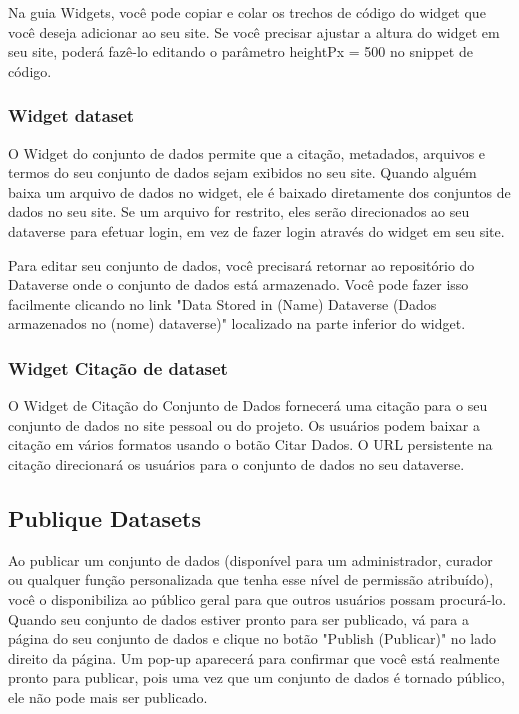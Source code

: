 \documentclass[12pt,hidelinks]{article}
\begin{document}
Na guia Widgets, você pode copiar e colar os trechos de código do widget que você deseja adicionar ao seu site. Se você precisar ajustar a altura do widget em seu site, poderá fazê-lo editando o parâmetro heightPx = 500 no snippet de código.

        \subsubsection{Widget dataset}
        
\qquad O Widget do conjunto de dados permite que a citação, metadados, arquivos e termos do seu conjunto de dados sejam exibidos no seu site. Quando alguém baixa um arquivo de dados no widget, ele é baixado diretamente dos conjuntos de dados no seu site. Se um arquivo for restrito, eles serão direcionados ao seu dataverse para efetuar login, em vez de fazer login através do widget em seu site.

Para editar seu conjunto de dados, você precisará retornar ao repositório do Dataverse onde o conjunto de dados está armazenado. Você pode fazer isso facilmente clicando no link "Data Stored in (Name) Dataverse (Dados armazenados no (nome) dataverse)" localizado na parte inferior do widget.
        
        \subsubsection{Widget Citação de dataset}
        
\qquad O Widget de Citação do Conjunto de Dados fornecerá uma citação para o seu conjunto de dados no site pessoal ou do projeto. Os usuários podem baixar a citação em vários formatos usando o botão Citar Dados. O URL persistente na citação direcionará os usuários para o conjunto de dados no seu dataverse.
        
    \subsection{Publique Datasets}
    
\qquad Ao publicar um conjunto de dados (disponível para um administrador, curador ou qualquer função personalizada que tenha esse nível de permissão atribuído), você o disponibiliza ao público geral para que outros usuários possam procurá-lo. Quando seu conjunto de dados estiver pronto para ser publicado, vá para a página do seu conjunto de dados e clique no botão "Publish (Publicar)" no lado direito da página. Um pop-up aparecerá para confirmar que você está realmente pronto para publicar, pois uma vez que um conjunto de dados é tornado público, ele não pode mais ser publicado.
\end{document}
